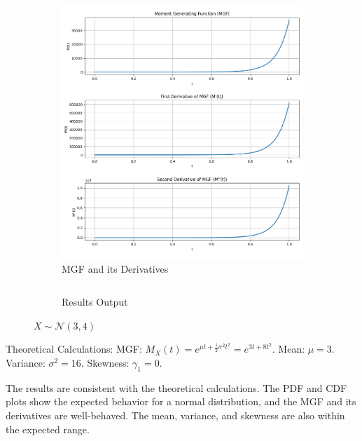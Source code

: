 \documentclass{article}
\begin{document}
\begin{figure}[H]
\begin{subfigure}{0.45\textwidth}
    \includegraphics[width=\linewidth]{results/section1/c1(2).png}
    \caption{MGF and its Derivatives}
  \end{subfigure}
  \begin{subfigure}{\textwidth}
    \inputminted{text}{results/section1/c1.txt}
    \caption{Results Output}
  \end{subfigure}
  \caption{$X\sim \mathcal{N}(3, 4)$}
\end{figure}

Theoretical Calculations:
MGF: $M_X(t) = e^{\mu t + \frac{1}{2}\sigma^2t^2}=e^{3t+8t^2}$.
Mean: $\mu = 3$.
Variance: $\sigma^2 = 16$.
Skewness: $\gamma_1 = 0$.

The results are consistent with the theoretical calculations. The PDF and CDF plots show the expected behavior for a normal distribution, and the MGF and its derivatives are well-behaved. The mean, variance, and skewness are also within the expected range.

\newpage
\end{document}
